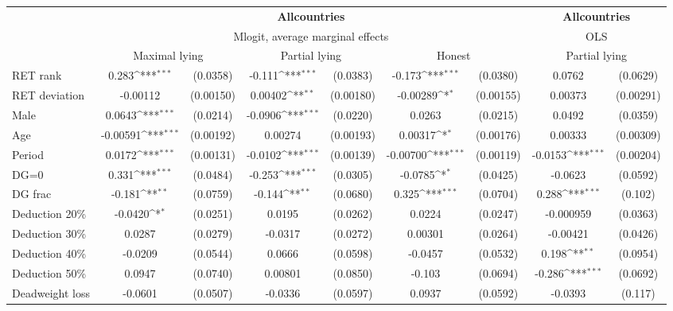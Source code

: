 \def\sym#1{\ifmmode^{#1}\else\(^{#1}\)\fi}
\begin{tabular}{l|cccccc|cc}
\hline\hline
&\multicolumn{6}{c|}{\bf All\space{}countries}&\multicolumn{2}{c}{\bf All\space{}countries}\\ &\multicolumn{6}{c|}{Mlogit, average marginal effects }&\multicolumn{2}{c}{OLS}\\
                &\multicolumn{2}{c}{Maximal lying}&\multicolumn{2}{c}{Partial lying}&\multicolumn{2}{c|}{Honest}  &\multicolumn{2}{c}{Partial lying}\\
\hline
RET rank        &    0.283\sym{***}& (0.0358)&   -0.111\sym{***}& (0.0383)&   -0.173\sym{***}& (0.0380)&   0.0762         & (0.0629)\\
RET deviation   & -0.00112         &(0.00150)&  0.00402\sym{**} &(0.00180)& -0.00289\sym{*}  &(0.00155)&  0.00373         &(0.00291)\\
Male            &   0.0643\sym{***}& (0.0214)&  -0.0906\sym{***}& (0.0220)&   0.0263         & (0.0215)&   0.0492         & (0.0359)\\
Age             & -0.00591\sym{***}&(0.00192)&  0.00274         &(0.00193)&  0.00317\sym{*}  &(0.00176)&  0.00333         &(0.00309)\\
Period          &   0.0172\sym{***}&(0.00131)&  -0.0102\sym{***}&(0.00139)& -0.00700\sym{***}&(0.00119)&  -0.0153\sym{***}&(0.00204)\\
DG=0          &    0.331\sym{***}& (0.0484)&   -0.253\sym{***}& (0.0305)&  -0.0785\sym{*}  & (0.0425)&  -0.0623         & (0.0592)\\
DG frac         &   -0.181\sym{**} & (0.0759)&   -0.144\sym{**} & (0.0680)&    0.325\sym{***}& (0.0704)&    0.288\sym{***}&  (0.102)\\
Deduction 20\%&  -0.0420\sym{*}  & (0.0251)&   0.0195         & (0.0262)&   0.0224         & (0.0247)&-0.000959         & (0.0363)\\
Deduction 30\%&   0.0287         & (0.0279)&  -0.0317         & (0.0272)&  0.00301         & (0.0264)& -0.00421         & (0.0426)\\
Deduction 40\%&  -0.0209         & (0.0544)&   0.0666         & (0.0598)&  -0.0457         & (0.0532)&    0.198\sym{**} & (0.0954)\\
Deduction 50\%&   0.0947         & (0.0740)&  0.00801         & (0.0850)&   -0.103         & (0.0694)&   -0.286\sym{***}& (0.0692)\\
Deadweight loss&  -0.0601         & (0.0507)&  -0.0336         & (0.0597)&   0.0937         & (0.0592)&  -0.0393         &  (0.117)\\

\end{tabular}

